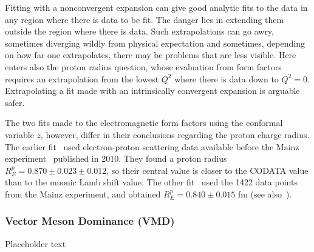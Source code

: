Fitting with a nonconvergent expansion can give good analytic fits to the data in any region where there is data to be fit.  The danger lies in extending them outside the region where there is data.  Such extrapolations can go awry,  sometimes diverging wildly from physical expectation and sometimes, depending on how far one extrapolates, there may be problems that are less visible.  Here enters also the proton radius question, whose evaluation from form factors requires an extrapolation from the lowest $Q^2$ where there is data down to $Q^2 = 0$.  Extrapolating a fit made with an intrinsically convergent expansion is arguable safer.

The two fits made to the electromagnetic form factors using the conformal variable $z$, however, differ in their conclusions regarding the proton charge radius.  The earlier fit~\cite{Hill:2010yb}  used electron-proton scattering data available before the Mainz experiment~\cite{Bernauer:2010wm} published in 2010.   They found a proton radius $R_E^p =  0.870\pm 0.023 \pm 0.012$,  so their central value is closer to the CODATA value than to the muonic Lamb shift value.  The other fit~\cite{Lorenz:2014vha} used the 1422 data points from the Mainz experiment, and obtained $R_E^p = 0.840 \pm 0.015$ fm (see also~\cite{Lorenz:2014yda}).




\subsubsection{Vector Meson Dominance (VMD)}
\label{subsubsec:vmd}


Placeholder text

